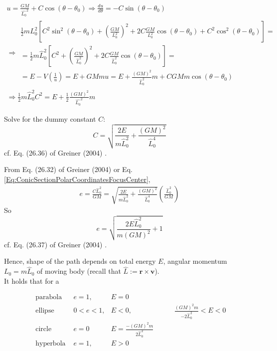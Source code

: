\documentclass[10pt]{amsart}
\begin{document}
\begin{multicols*}{2}
\[
\begin{gathered}
u = \frac{GM}{ \widehat{L_0}^2 } + C \cos{(\theta - \theta_0)} \Longrightarrow \frac{du}{d\theta} = -C \sin{(\theta - \theta_0)} \\
\Longrightarrow \begin{gathered}
\frac{1}{2} m L_0^2 \left[ C^2 \sin^2{ (\theta - \theta_0)} + \left( \frac{GM}{L_0^2} \right)^2 + 2 C \frac{GM}{L_0^2} \cos{(\theta - \theta_0)} + C^2 \cos^2{(\theta - \theta_0)} \right] = \\
= \frac{1}{2} m \widehat{L}_0^2 \left[ C^2 + \left( \frac{GM}{\widehat{L}_0^2 } \right)^2 + 2 C \frac{GM}{ \widehat{L}_0^2 } \cos{(\theta - \theta_0)} \right] = \\
= E - V\left( \frac{1}{u} \right) = E + GMmu = E + \frac{(GM)^2 }{ \widehat{L}_0^2 } m + C GM m \cos{(\theta - \theta_0)}
\end{gathered} \\
\Longrightarrow \frac{1}{2} m \widehat{L}_0^2 C^2 = E + \frac{1}{2} \frac{ (GM)^2 }{ \widehat{L_0}^2 } m 
\end{gathered} 
\]

Solve for the dummy constant $C$:
\begin{equation}
C = \sqrt{ \frac{2E}{m \widehat{L}_0^2 } + \frac{ (GM)^2 }{ \widehat{L}_0^4 } }
\end{equation}
cf. Eq. (26.36) of Greiner (2004) \cite{Grei2004}.

From Eq. (26.32) of Greiner (2004) \cite{Grei2004} or Eq. \ref{Eq:ConicSectionPolarCoordinatesFocusCenter}, 
\[
\begin{gathered}
e = \frac{C \widehat{L}_0^2 }{ GM} = \sqrt{ \frac{2 E }{ m \widehat{L}_0^2} + \frac{ (GM)^2 }{\widehat{L}_0^4 } } \left( \frac{\widehat{L}_0^2 }{ GM} \right)  
\end{gathered}
\]
So
\begin{equation}
\boxed{ e =  \sqrt{ \frac{ 2 E \widehat{L}_0^2 }{ m (GM)^2 } + 1 } }
\end{equation}
cf. Eq. (26.37) of Greiner (2004) \cite{Grei2004}. 

Hence, shape of the path depends on total energy $E$, angular momentum $L_0 = m \widehat{L}_0$ of moving body (recall that $\widehat{L} := \mathbf{r} \times \mathbf{v}$). \\

It holds that for a

\[
\begin{aligned} 
\text{ parabola } & e = 1, & E = 0 & \\  
\text{ ellipse } & 0 < e < 1, & E < 0, & \qquad \, \frac{ (GM)^2 m }{ -2 \widehat{L}_0^2 } < E < 0 \\  
\text{ circle } &  e = 0 & E = \frac{ -(GM)^2 m }{ 2\widehat{L}_0^2 } & \\
\text{ hyperbola } & e = 1, & E > 0 & \, 
\end{aligned} 
\]


\end{multicols*}
\end{document}
